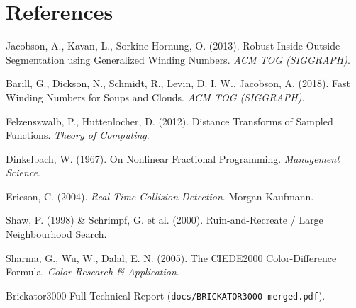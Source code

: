\documentclass[11pt,twoside]{article}
\newcommand{\code}[1]{\texttt{#1}}
\begin{document}
\section*{References}
\begin{enumerate}[leftmargin=*,nosep,label={[\arabic*]}]
  \item Jacobson, A., Kavan, L., Sorkine-Hornung, O. (2013). Robust Inside-Outside Segmentation using Generalized Winding Numbers. \emph{ACM TOG (SIGGRAPH)}.
  \item Barill, G., Dickson, N., Schmidt, R., Levin, D. I. W., Jacobson, A. (2018). Fast Winding Numbers for Soups and Clouds. \emph{ACM TOG (SIGGRAPH)}.
  \item Felzenszwalb, P., Huttenlocher, D. (2012). Distance Transforms of Sampled Functions. \emph{Theory of Computing}.
  \item Dinkelbach, W. (1967). On Nonlinear Fractional Programming. \emph{Management Science}.
  \item Ericson, C. (2004). \emph{Real-Time Collision Detection}. Morgan Kaufmann.
  \item Shaw, P. (1998) \& Schrimpf, G. et al. (2000). Ruin-and-Recreate / Large Neighbourhood Search.
  \item Sharma, G., Wu, W., Dalal, E. N. (2005). The CIEDE2000 Color-Difference Formula. \emph{Color Research \& Application}.
  \item Brickator3000 Full Technical Report (\code{docs/BRICKATOR3000-merged.pdf}).
\end{enumerate}
\end{document}
